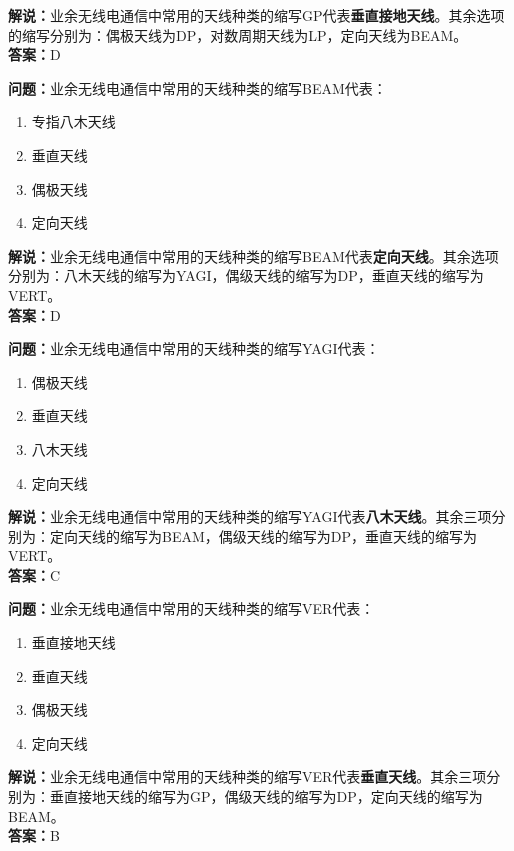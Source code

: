 \documentclass{ctexbook}
\begin{document}
\noindent\textbf{解说：}业余无线电通信中常用的天线种类的缩写GP代表\textbf{垂直接地天线}。其余选项的缩写分别为：偶极天线为DP，对数周期天线为LP，定向天线为BEAM。\\\noindent\textbf{答案：}D


\bigskip


\noindent\textbf{问题：}业余无线电通信中常用的天线种类的缩写BEAM代表：

\begin{enumerate}[label=\Alph*), leftmargin=3em]
	\item 专指八木天线
	\item 垂直天线
	\item 偶极天线
	\item 定向天线
\end{enumerate}

\noindent\textbf{解说：}业余无线电通信中常用的天线种类的缩写BEAM代表\textbf{定向天线}。其余选项分别为：八木天线的缩写为YAGI，偶级天线的缩写为DP，垂直天线的缩写为VERT。\\\noindent\textbf{答案：}D


\bigskip


\noindent\textbf{问题：}业余无线电通信中常用的天线种类的缩写YAGI代表：

\begin{enumerate}[label=\Alph*), leftmargin=3em]
	\item 偶极天线
	\item 垂直天线
	\item 八木天线
	\item 定向天线
\end{enumerate}

\noindent\textbf{解说：}业余无线电通信中常用的天线种类的缩写YAGI代表\textbf{八木天线}。其余三项分别为：定向天线的缩写为BEAM，偶级天线的缩写为DP，垂直天线的缩写为VERT。\\\noindent\textbf{答案：}C


\bigskip


\noindent\textbf{问题：}业余无线电通信中常用的天线种类的缩写VER代表：

\begin{enumerate}[label=\Alph*), leftmargin=3em]
	\item 垂直接地天线
	\item 垂直天线
	\item 偶极天线
	\item 定向天线
\end{enumerate}

\noindent\textbf{解说：}业余无线电通信中常用的天线种类的缩写VER代表\textbf{垂直天线}。其余三项分别为：垂直接地天线的缩写为GP，偶级天线的缩写为DP，定向天线的缩写为BEAM。\\\noindent\textbf{答案：}B
\end{document}
